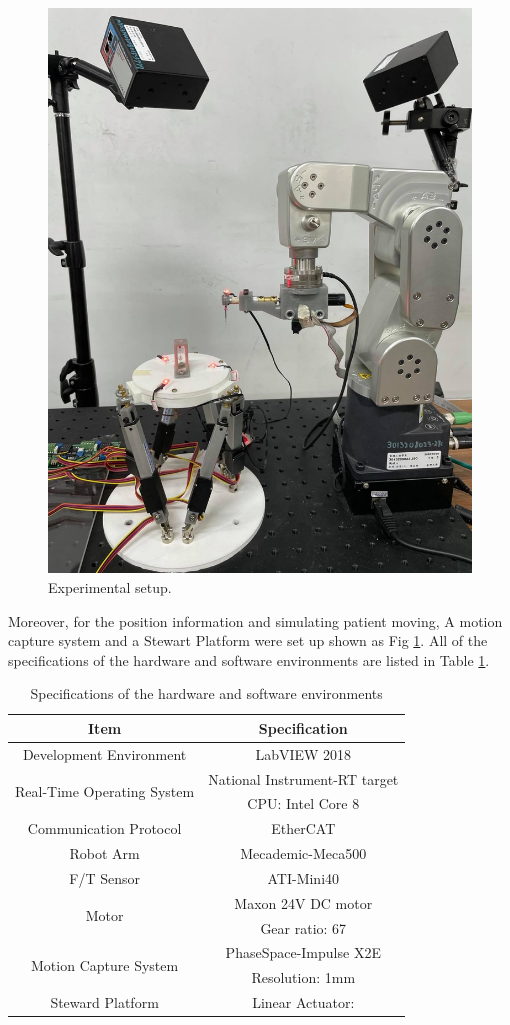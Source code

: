 \begin{figure}[htbp]
\begin{center}
\includegraphics[width=0.6\linewidth]{Images/System.jpg}
\caption{Experimental setup.}
\label{fig:system}
\end{center}
\end{figure}
\par
Moreover, for the position information and simulating patient moving, A motion capture system and a Stewart Platform were set up shown as Fig \ref{fig:system}. All of the specifications of the hardware and software environments are listed in Table \ref{tab:exp_specification}.

\begin{table}[htbp]
\centering
\caption{Specifications of the hardware and software environments}
\label{tab:exp_specification}
\par
\begin{tabular}{c|c} 
\hline \hline
Item											&Specification					\\	\hline
Development Environment							&LabVIEW 2018					\\	\hline
\multirow{2}{*}{Real-Time Operating System}		&National Instrument-RT target	\\
												&CPU: Intel Core 8				\\	\hline
Communication Protocol							&EtherCAT						\\	\hline
Robot Arm										&Mecademic-Meca500				\\	\hline
F/T Sensor										&ATI-Mini40						\\	\hline
\multirow{2}{*}{Motor}							&Maxon 24V DC motor				\\
												&Gear ratio: 67					\\	\hline
\multirow{2}{*}{Motion Capture System}			&PhaseSpace-Impulse X2E 		\\
												&Resolution: 1mm				\\	\hline
Steward Platform								&Linear Actuator: 				\\	
\hline \hline
\end{tabular}
\end{table}

